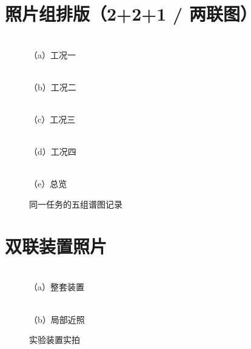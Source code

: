 \documentclass[UTF8,zihao=5,a4paper]{ctexart}
\newcommand{\photobox}[1][3.0cm]{\fbox{\rule{0pt}{#1}\rule{1.6\dimexpr#1\relax}{0pt}}}
\begin{document}
\section{照片组排版（2+2+1 / 两联图）}
\begin{figure}[H]\centering
\begin{minipage}[b]{.47\linewidth}\centering\photobox[3.2cm]\\[2pt]{（a）工况一}\end{minipage}\hfill
\begin{minipage}[b]{.47\linewidth}\centering\photobox[3.2cm]\\[2pt]{（b）工况二}\end{minipage}

\vspace{4pt}
\begin{minipage}[b]{.47\linewidth}\centering\photobox[3.2cm]\\[2pt]{（c）工况三}\end{minipage}\hfill
\begin{minipage}[b]{.47\linewidth}\centering\photobox[3.2cm]\\[2pt]{（d）工况四}\end{minipage}

\vspace{4pt}
\begin{minipage}[b]{.62\linewidth}\centering\photobox[3.2cm]\\[2pt]{（e）总览}\end{minipage}
\caption{同一任务的五组谱图记录}
\label{fig:grid}
\end{figure}

\section{双联装置照片}
\begin{figure}[H]\centering
\begin{minipage}[b]{.49\linewidth}\centering
\photobox[4.6cm]\\[2pt]
{（a）整套装置}
\end{minipage}\hfill
\begin{minipage}[b]{.49\linewidth}\centering
\photobox[4.6cm]\\[2pt]
{（b）局部近照}
\end{minipage}
\caption{实验装置实拍}
\label{fig:photos}
\end{figure}
\end{document}
